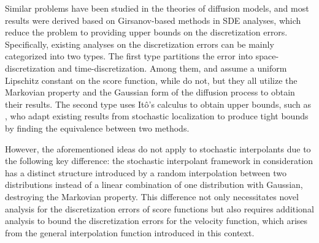 Similar problems have been studied in the theories of diffusion models, and most results were derived based on Girsanov-based methods in SDE analyses, which reduce the problem to providing upper bounds on the discretization errors. 
Specifically, existing analyses on the discretization errors can be mainly categorized into two types. The first type partitions the error into space-discretization and time-discretization. Among them, \citet{lee2022polynomial} and \citet{chen2023ddpm} assume a uniform Lipschitz constant on the score function, while \citet{chen2023improved} do not, but they all utilize the Markovian property and the Gaussian form of the diffusion process to obtain their results. 
The second type uses It\^o's calculus to obtain upper bounds, such as \citet{dlinear}, who adapt existing results from stochastic localization to produce tight bounds by finding the equivalence between two methods.

However, the aforementioned ideas do not apply to stochastic interpolants due to the following key difference: the stochastic interpolant framework in consideration has a distinct structure introduced by a random interpolation between two distributions instead of a linear combination of one distribution with Gaussian, destroying the Markovian property. %
This difference not only necessitates novel analysis for the discretization errors of score functions but also requires additional analysis to bound the discretization errors for the velocity function, which arises from the general interpolation function introduced in this context. 

